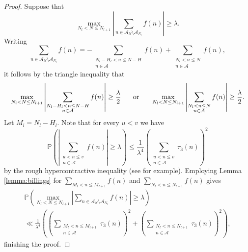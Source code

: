 \documentclass[11pt]{tran-l}
\theoremstyle{definition}
\theoremstyle{remark}
\numberwithin{equation}{section}
\begin{document}
\begin{proof}
Suppose that 
\begin{equation*}
    \max_{N_l<N\leq N_{l+1}}\left\lvert\sum_{n\in\mathcal A_N\setminus\mathcal A_{N_l}}f(n)\right\rvert\geq \lambda.
\end{equation*} 
Writing 
\begin{equation*}
    \sum_{n\in\mathcal A_N\setminus\mathcal A_{N_l}}f(n) = -\sum_{\substack{N_l-H_l<n\leq N-H \\ n\in\mathcal A}}f(n) + \sum_{\substack{N_l<n\leq N \\ n\in\mathcal A}}f(n),
\end{equation*} it follows by the triangle inequality that 
\begin{equation*}
    \max_{N_l<N\leq N_{l+1}}\left\lvert \sum_{\substack{N_l-H_l<n\leq N-H \\ n\in\mathcal A}}f(n)\right\rvert \geq \frac{\lambda}2 \hspace{0.5cm}\text{ or }\hspace{0.5cm} \max_{N_l<N\leq N_{l+1}}\left\lvert \sum_{\substack{N_l<n\leq N \\ n\in\mathcal A}}f(n)\right\rvert\geq \frac{\lambda }{2}.
\end{equation*} 
Let $M_l = N_l - H_l$. Note that for every $u<v$ we have
\begin{equation*}
    \mathbb P\left(\left\lvert \sum_{\substack{u < n\leq v \\ n\in\mathcal A}}f(n) \right\rvert\geq\lambda\right)\leq \frac{1}{\lambda^4}\left(\sum_{\substack{u<n\leq v \\ n\in\mathcal A}} \tau_3(n)\right)^2
\end{equation*} by the rough hypercontractive inequality (see \cite[Probability Result 1]{Harper2019_MomentsII} for example). Employing Lemma \ref{lemma:billings} for $\sum_{M_l<n\leq M_{l+1}}f(n)$ and $\sum_{N_l<n\leq N_{l+1}}f(n)$ gives 
\begin{multline*}
    \mathbb P\left(\max_{N_l<N\leq N_{l+1}}\left\lvert\sum_{n\in\mathcal A_N\setminus\mathcal A_{N_l}}f(n)\right\rvert\geq \lambda\right) \\ \ll \frac{1}{\lambda^4}\left(\left(\sum_{\substack{M_l<n\leq M_{l+1} \\ n\in\mathcal A}} \tau_3(n)\right)^2 + \left(\sum_{\substack{N_l<n\leq N_{l+1} \\ n\in\mathcal A}} \tau_3(n)\right)^2 \right),
\end{multline*}
finishing the proof. 
\end{proof}
\end{document}
